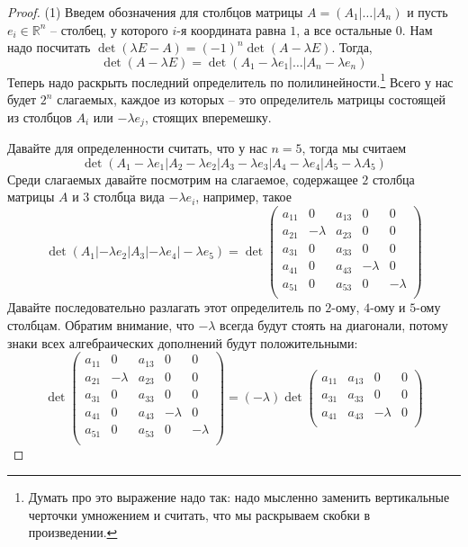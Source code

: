 \begin{proof}
(1) Введем обозначения для столбцов матрицы $A = (A_1|\ldots|A_n)$ и пусть $e_i\in\mathbb R^n$ -- столбец, у которого $i$-я координата равна $1$, а все остальные $0$. Нам надо посчитать $\det(\lambda E - A) = (-1)^n \det(A-\lambda E)$. Тогда, 
\[
\det(A-\lambda E) = \det(A_1 - \lambda e_1|\ldots|A_n - \lambda e_n)
\]
Теперь надо раскрыть последний определитель по полилинейности.\footnote{Думать про это выражение надо так: надо мысленно заменить вертикальные черточки умножением и считать, что мы раскрываем скобки в произведении.} Всего у нас будет $2^n$ слагаемых, каждое из которых -- это определитель матрицы состоящей из столбцов $A_i$ или $-\lambda e_j$, стоящих вперемешку.

Давайте для определенности считать, что у нас $n=5$, тогда мы считаем
\[
\det(A_1-\lambda e_1|A_2-\lambda e_2|A_3 - \lambda e_3|A_4 -\lambda e_4|A_5 - \lambda A_5)
\]
Среди слагаемых давайте посмотрим на слагаемое, содержащее $2$ столбца матрицы $A$ и $3$ столбца вида $-\lambda e_i$, например, такое
\[
\det(A_1|-\lambda e_2|A_3|-\lambda e_4|-\lambda e_5) = 
\det
\begin{pmatrix}
{a_{11}}&{0}&{a_{13}}&{0}&{0}\\
{a_{21}}&{-\lambda}&{a_{23}}&{0}&{0}\\
{a_{31}}&{0}&{a_{33}}&{0}&{0}\\
{a_{41}}&{0}&{a_{43}}&{-\lambda}&{0}\\
{a_{51}}&{0}&{a_{53}}&{0}&{-\lambda}\\
\end{pmatrix}
\]
Давайте последовательно разлагать этот определитель по $2$-ому, $4$-ому и $5$-ому столбцам. Обратим внимание, что $-\lambda$ всегда будут стоять на диагонали, потому знаки всех алгебраических дополнений будут положительными:
\[
\det
\begin{pmatrix}
{a_{11}}&{0}&{a_{13}}&{0}&{0}\\
{a_{21}}&{-\lambda}&{a_{23}}&{0}&{0}\\
{a_{31}}&{0}&{a_{33}}&{0}&{0}\\
{a_{41}}&{0}&{a_{43}}&{-\lambda}&{0}\\
{a_{51}}&{0}&{a_{53}}&{0}&{-\lambda}\\
\end{pmatrix}
=
(-\lambda)
\det
\begin{pmatrix}
{a_{11}}&{a_{13}}&{0}&{0}\\
{a_{31}}&{a_{33}}&{0}&{0}\\
{a_{41}}&{a_{43}}&{-\lambda}&{0}\\

\end{pmatrix}\]
\end{proof}
